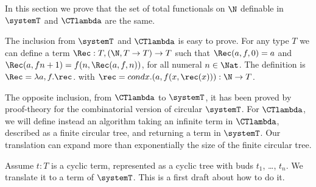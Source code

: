 In this section we prove that the set of total functionals on $\N$ definable in 
$\systemT$ and $\CTlambda$ are the same.

The inclusion from $\systemT$ and $\CTlambda$ is easy to prove.
For any type $T$ we can define a term $\Rec:T,(\N,T \rightarrow T)\rightarrow T$ such that
$\Rec(a,f,0) = a$ and $\Rec(a,fn+1) = f(n,\Rec(a,f,n))$, for all numeral $n \in \Nat$.
The definition is $\Rec = \lambda a,f.\rec$. with $\rec = cond x.(a,f(x,\rec(x))) : \N \rightarrow T$.

The opposite inclusion, from $\CTlambda$ to $\systemT$, it has been proved by proof-theory for the
combinatorial version of circular $\systemT$. For $\CTlambda$, we will define instead an algorithm
taking an infinite term in  $\CTlambda$, described as a finite circular tree, 
and returning a term in $\systemT$. Our translation can expand
more than exponentially the size of the finite circular tree.

Assume $t:T$ is a cyclic term, represented as a cyclic tree with buds $t_1$, \ldots, $t_n$.
We translate it to a term of $\systemT$. This is a first draft about how to do it.
 
